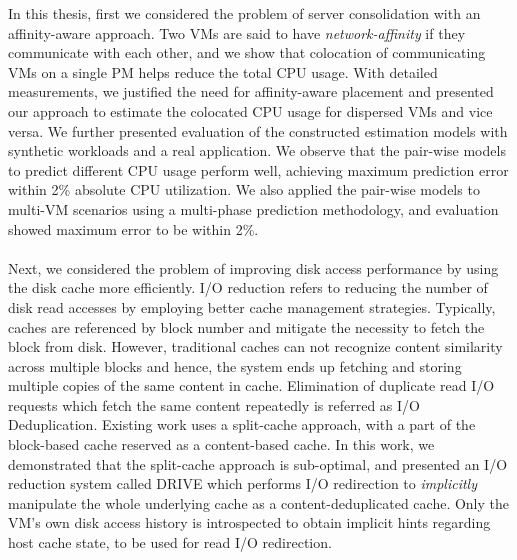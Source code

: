 In this thesis, first we considered the problem of 
server consolidation with an affinity-aware approach. Two VMs are 
said to have \textit{network-affinity} if they 
communicate with each other, and we show that colocation
of communicating VMs on a single PM helps reduce the total CPU usage.
With detailed measurements, we justified the need for
affinity-aware placement and presented our approach to estimate
the colocated CPU usage for dispersed VMs and vice versa. We 
further presented evaluation
of the constructed estimation models with synthetic workloads
and a real application. We observe that the pair-wise models
to predict different CPU usage 
perform well, achieving maximum prediction
error within 2\% absolute CPU utilization. We also applied
the pair-wise models to multi-VM scenarios using a multi-phase
prediction methodology, and evaluation showed maximum
error to be within 2\%.
\\
\\
Next, we considered the problem of improving disk access performance
by using the disk cache more efficiently. 
I/O reduction refers to reducing the number of disk read accesses by
employing better cache management strategies. Typically, caches are
referenced by block number and mitigate the necessity to fetch the block
from disk. However, traditional caches can not recognize content similarity
across multiple blocks and hence, the system ends up fetching and storing
multiple copies of the same content in cache.
Elimination of duplicate read I/O requests which fetch the same
content repeatedly is referred as I/O Deduplication.
Existing work uses a split-cache approach, with a part of the block-based
cache reserved as a content-based cache. In this work, we demonstrated
that the split-cache approach is sub-optimal, and presented an
I/O reduction system called DRIVE which performs I/O
redirection to \textit{implicitly} manipulate the whole underlying cache as
a content-deduplicated cache. Only the VM's own disk access history is
introspected to obtain implicit hints regarding host cache state, to be used
for read I/O redirection.

